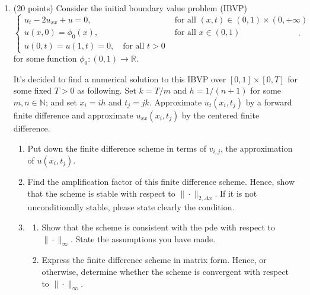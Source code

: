 \documentclass[a4paper,12pt]{article}
\begin{document}
\begin{enumerate}
\begin{proof}
\begin{enumerate}
    The payoff of a European call option is
    \[
    C_T=(S_T-K)^+.
    \]
    Therefore, the terminal payoffs are
    \[
    C_{uu}=(123.6311-100)^+=23.6311,
    \]
    \[
    C_{ud}=(100-100)^+=0,
    \]
    and
    \[
    C_{dd}=(80.8858-100)^+=0.
    \]

    Using backward induction,
    \[
    C_0
    =
    e^{-rT}
    \left[
    p^2 C_{uu}
    +2p(1-p)C_{ud}
    +(1-p)^2C_{dd}
    \right].
    \]
    Since \(C_{ud}=C_{dd}=0\), this simplifies to
    \[
    C_0=e^{-0.05}p^2C_{uu}.
    \]
    Substituting the values,
    \[
    C_0
    =
    e^{-0.05}(0.5926)^2(23.6311).
    \]
    Hence,
    \[
    C_0\approx 7.8945.
    \]

    Therefore, the 2-step CRR binomial tree price of the European call option is
    \[
    \boxed{C_0\approx 7.89.}
    \]

\end{enumerate}

\end{proof}

\newpage
\item (20 points) Consider the initial boundary value problem (IBVP)
\[ \left\{ \begin{array}{ll}
u_t - 2u_{xx} + u = 0, &\quad \mbox{for all $(x,t)\in(0,1)\times(0,+\infty)$}\\
u(x,0) = \phi_0(x), &\quad \mbox{for all $x \in (0,1)$}\\
u(0,t)=u(1,t) = 0, \quad \mbox{for all $t > 0$}
\end{array}\right.. \]
for some function $\phi_0 : (0,1) \to \mathbb R$. 

It's decided to find a numerical solution to this IBVP over $[0,1]\times[0,T]$ for some fixed $T>0$ as following. Set $k=T/m$ and $h=1/(n+1)$ for some $m, n \in \mathbb N$; and set $x_i=ih$ and $t_j=jk$. Approximate $u_t(x_i,t_j)$ by a forward finite difference and approximate $u_{xx}(x_i,t_j)$ by the centered finite difference.

\begin{enumerate}
\item Put down the finite difference scheme in terms of $v_{i,j}$, the approximation of $u(x_i,t_j)$.
\item Find the amplification factor of this finite difference scheme. Hence, show that the scheme is  stable with respect to $\|\cdot\|_{2,\Delta x}$. If it is not unconditionally stable, please state clearly the condition.
\item 
\begin{enumerate}[label=(\roman*)]
\item Show that the scheme is consistent with the pde with respect to $\|\cdot\|_{\infty}$. State the assumptions you have made.
\item Express the finite difference scheme in matrix form. Hence, or otherwise, determine whether the scheme is convergent with respect to $\|\cdot\|_\infty$.
\end{enumerate}
\end{enumerate}



\end{enumerate}
\end{document}
